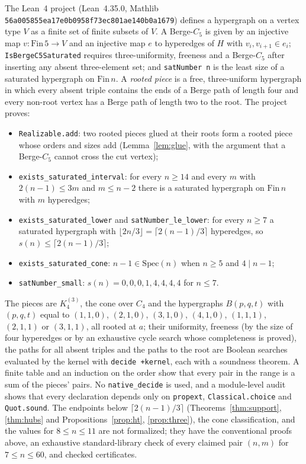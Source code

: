 \documentclass[11pt]{article}
\theoremstyle{remark}
\begin{document}
The Lean~4 project (Lean~4.35.0, Mathlib
\texttt{56a005855ea17e0b0958f73ec801ae140b0a1679}) defines a hypergraph
on a vertex type $V$ as a finite set of finite subsets of $V$. A
Berge-$C_5$ is given by an injective map $v:\mathrm{Fin}\,5\to V$ and an
injective map $e$ to hyperedges of $H$ with $v_i,v_{i+1}\in e_i$;
\texttt{IsBergeC5Saturated} requires three-uniformity, freeness and a
Berge-$C_5$ after inserting any absent three-element set; and
\texttt{satNumber n} is the least size of a saturated hypergraph on
$\mathrm{Fin}\,n$. A \emph{rooted piece} is a free, three-uniform
hypergraph in which every absent triple contains the ends of a Berge path
of length four and every non-root vertex has a Berge path of length two to
the root. The project proves:
\begin{itemize}
\item \texttt{Realizable.add}: two rooted pieces glued at their roots form
a rooted piece whose orders and sizes add (Lemma~\ref{lem:glue}, with the
argument that a Berge-$C_5$ cannot cross the cut vertex);
\item \texttt{exists\_saturated\_interval}: for every $n\ge14$ and every $m$
with $2(n-1)\le3m$ and $m\le n-2$ there is a saturated hypergraph on
$\mathrm{Fin}\,n$ with $m$ hyperedges;
\item \texttt{exists\_saturated\_lower} and \texttt{satNumber\_le\_lower}:
for every $n\ge7$ a saturated hypergraph with
$\lfloor2n/3\rfloor=\lceil2(n-1)/3\rceil$ hyperedges, so
$s(n)\le\lceil2(n-1)/3\rceil$;
\item \texttt{exists\_saturated\_cone}: $n-1\in\mathrm{Spec}(n)$ when $n\ge5$
and $4\mid n-1$;
\item \texttt{satNumber\_small}: $s(n)=0,0,0,1,4,4,4,4$ for $n\le7$.
\end{itemize}
The pieces are $K_4^{(3)}$, the cone over $C_4$ and the hypergraphs
$B(p,q,t)$ with $(p,q,t)$ equal to $(1,1,0)$, $(2,1,0)$, $(3,1,0)$,
$(4,1,0)$, $(1,1,1)$, $(2,1,1)$ or $(3,1,1)$, all rooted at $a$; their uniformity, freeness (by the
size of four hyperedges or by an exhaustive cycle search whose
completeness is proved), the paths for all absent triples and the paths to
the root are Boolean searches evaluated by the kernel with
\texttt{decide +kernel}, each with a soundness theorem. A finite table and
an induction on the order show that every pair in the range is a sum of
the pieces' pairs. No \texttt{native\_decide} is used, and a module-level
audit shows that every declaration depends only on \texttt{propext},
\texttt{Classical.choice} and \texttt{Quot.sound}. The endpoints below
$\lceil2(n-1)/3\rceil$ (Theorems~\ref{thm:support}, \ref{thm:hubs} and
Propositions~\ref{prop:ht}, \ref{prop:three}), the cone classification,
and the values for $8\le n\le11$ are not formalized; they have the
conventional proofs above, an exhaustive standard-library check of every
claimed pair $(n,m)$ for $7\le n\le60$, and checked certificates.
\end{document}
